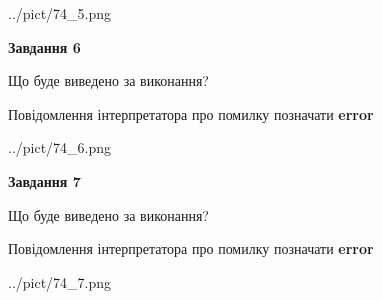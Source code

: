 \documentclass[10pt, ukrainian]{article}
\begin{document}
{\begin {large}
\begin{center}
	{../pict/74_5.png}
\end{center}
\newpage

{\begin {center}\textbf{Завдання 6}\end {center}}\par
Що буде виведено за виконання? \par
Повідомлення інтерпретатора про помилку позначати \textbf{error}

\begin{center}
	{../pict/74_6.png}
\end{center}
\newpage

{\begin {center}\textbf{Завдання 7}\end {center}}\par
Що буде виведено за виконання? \par
Повідомлення інтерпретатора про помилку позначати \textbf{error}

\begin{center}
	{../pict/74_7.png}
\end{center}
\newpage

\end {large}}
\end{document}
